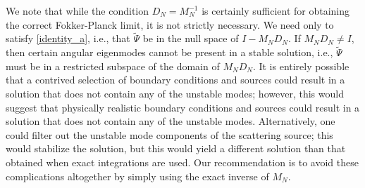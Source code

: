 We note that while the condition $D_N=M_N^{-1}$ is certainly sufficient for
obtaining the correct Fokker-Planck limit, it is not strictly necessary. We
need only to satisfy \cref{identity_a}, i.e., that $\tilde{\Psi}$ be
in the null space of $I-M_ND_N$. If $M_N D_N\neq I$, then certain angular
eigenmodes cannot be present in a stable solution, i.e., $\tilde{\Psi}$ must
be in a restricted subspace of the domain of $M_N D_N$. It is entirely
possible that a contrived selection of boundary conditions and sources could
result in a solution that does not contain any of the unstable modes; however,
this would suggest that physically realistic boundary conditions and
sources could result in a solution that does not contain any of the unstable
modes. Alternatively, one could filter out the unstable mode components of the
scattering source; this would stabilize the solution, but this would yield a
different solution than that obtained when exact integrations are used. Our
recommendation is to avoid these complications altogether by simply using the
exact inverse of $M_N$.\\

